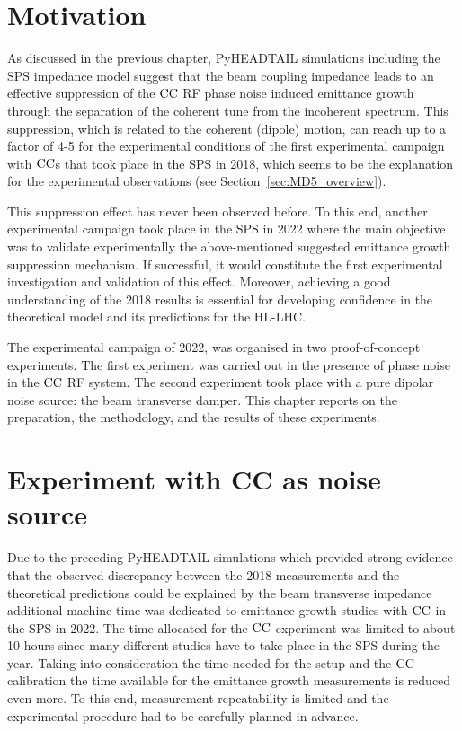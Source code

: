 \section{Motivation}\label{sec:motivation_md_2022}
As discussed in the previous chapter, PyHEADTAIL simulations including the SPS impedance model suggest that the beam coupling impedance leads to an effective suppression of the ${\mathrm{CC}}$ RF phase noise induced emittance growth through the separation of the coherent tune from the incoherent spectrum. This suppression, which is related to the coherent (dipole) motion, can reach up to a factor of 4-5 for the experimental conditions of the first experimental campaign with ${\mathrm{CC}}$s that took place in the SPS in 2018, which seems to be the explanation for the experimental observations (see Section~\ref{sec:MD5_overview}).

This suppression effect has never been observed before. To this end, another experimental campaign took place in the SPS in 2022 where the main objective was to validate experimentally the above-mentioned suggested emittance growth suppression mechanism. If successful, it would constitute the first experimental investigation and validation of this effect. Moreover, achieving a good understanding of the 2018 results is essential for developing confidence in the theoretical model and its predictions for the HL-LHC.

The experimental campaign of 2022, was organised in two proof-of-concept experiments. The first experiment was carried out in the presence of phase noise in the ${\mathrm{CC}}$ RF system. The second experiment took place with a pure dipolar noise source: the beam transverse damper. This chapter reports on the preparation, the methodology, and the results of these experiments.

\section{Experiment with CC as noise source}\label{sec:cc_md_2022}
Due to the preceding PyHEADTAIL simulations which provided strong evidence that the observed discrepancy between the 2018 measurements and the theoretical predictions could be explained by the beam transverse impedance additional machine time was dedicated to emittance growth studies with ${\mathrm{CC}}$ in the SPS in 2022. The time allocated for the ${\mathrm{CC}}$ experiment was limited to about 10 hours since many different studies have to take place in the SPS during the year. Taking into consideration the time needed for the setup and the ${\mathrm{CC}}$ calibration the time available for the emittance growth measurements is reduced even more. To this end, measurement repeatability is limited and the experimental procedure had to be carefully planned in advance.

